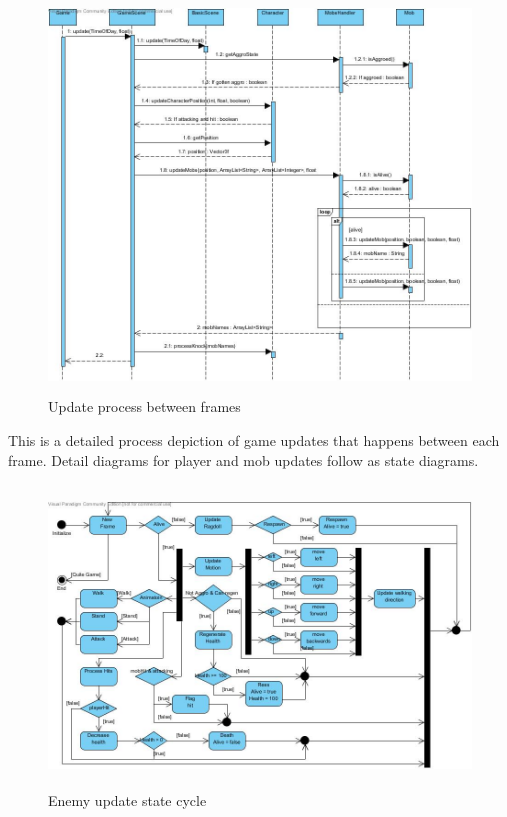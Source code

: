 \documentclass[letterpaper]{article}
\begin{document}
					\begin{figure}[H]
					\centering
					\includegraphics[width=180mm, height=105mm]{UML_Diagram/Sequence/Update_Sequence.jpg}
					\caption{Update process between frames}
					\label{overflow}
					\end{figure}
					
					This is a detailed process depiction of game updates that happens between each frame. Detail diagrams for player and mob updates follow as state diagrams.
					
					\begin{figure}[H]
					\centering
					\includegraphics[width=180mm, height=80mm]{UML_Diagram/State/Player_State.jpg}
					\caption{Enemy update state cycle}
					\label{overflow}
					\end{figure}
					
\end{document}
